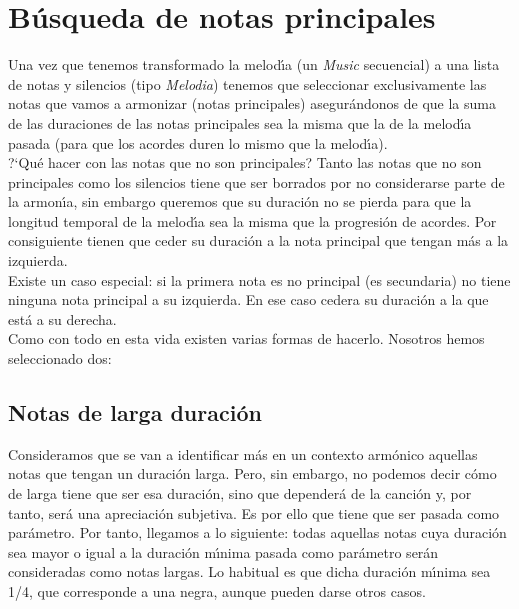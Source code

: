 \section{B\'usqueda de notas principales}
Una vez que tenemos transformado la melod\'\i a (un \emph{Music} secuencial)
a una lista de notas y silencios (tipo \emph{Melodia}) tenemos que
seleccionar exclusivamente las notas que vamos a armonizar
(notas principales) asegur\'andonos de que la suma de las
duraciones de las notas principales sea la misma que la de la
melod\'\i a pasada (para que los acordes duren lo mismo que la
melod\'\i a).\\
\indent ?`Qu\'e hacer con las notas que no son principales? Tanto las notas que 
no son principales como los silencios tiene que ser borrados por no 
considerarse parte de la armon\'\i a, sin embargo queremos
que su duraci\'on no se pierda para que la longitud temporal de 
la melod\'\i a sea la misma que la progresi\'on de acordes. Por consiguiente tienen
que ceder su duraci\'on a la nota principal que tengan m\'as a la izquierda.\\
\indent Existe un caso especial: si la primera nota es no principal (es secundaria)
no tiene ninguna nota principal a su izquierda. En ese caso cedera 
su duraci\'on a la que est\'a a su derecha.\\
Como con todo en esta vida existen varias formas de hacerlo. Nosotros
hemos seleccionado dos:

\subsection{Notas de larga duraci\'on}
Consideramos que se van a identificar m\'as en un contexto arm\'onico 
aquellas notas que tengan un duraci\'on larga. Pero, sin embargo,
no podemos decir c\'omo de larga tiene que ser esa duraci\'on, sino que depender\'a de la
canci\'on y, por tanto, ser\'a una apreciaci\'on subjetiva. Es por ello
que tiene que ser pasada como par\'ametro. Por tanto, llegamos a lo siguiente: todas aquellas notas
cuya duraci\'on sea mayor o igual a la duraci\'on m\'\i nima
pasada como par\'ametro ser\'an consideradas como notas largas. Lo 
habitual es que dicha duraci\'on m\'\i nima sea 1/4, que corresponde
a una negra, aunque pueden darse otros casos.

